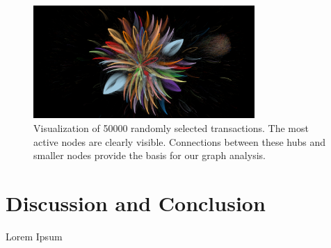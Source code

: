 \documentclass{article} %
\begin{document}
\begin{figure}
\centering
  \includegraphics[trim={9cm 0 3cm 0},clip, width=0.75\textwidth]{50000visualization.png}
\caption{Visualization of 50000 randomly selected transactions. The most active nodes are clearly visible. Connections between these hubs and smaller nodes provide the basis for our graph analysis.}
  \label{fig:vis}
\end{figure}


\section{Discussion and Conclusion}


Lorem Ipsum






\end{document}
